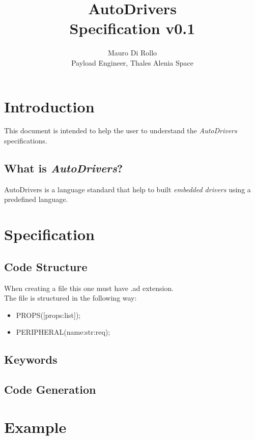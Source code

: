 \documentclass[]{article}
\title{
    AutoDrivers\\
    \large Specification v0.1
    }
\author{Mauro Di Rollo\\Payload Engineer, Thales Alenia Space}
\date{}
\begin{document}
\maketitle
\tableofcontents
\listoffigures
\listoftables

\section{Introduction}

This document is intended to help the user to understand the \emph{AutoDrivers} specifications.

\subsection{What is \emph{AutoDrivers}?}
AutoDrivers is a language standard that help to built \emph{embedded drivers} using a predefined
language.

\section{Specification}

\subsection{Code Structure}
When creating a file this one must have .ad extension.\\
The file is structured in the following way:
\begin{itemize}
    \item PROPS([props:list]);
    \item PERIPHERAL(name:str:req){};
\end{itemize}

\subsection{Keywords}

\subsection{Code Generation}

\section{Example}
\end{document}
